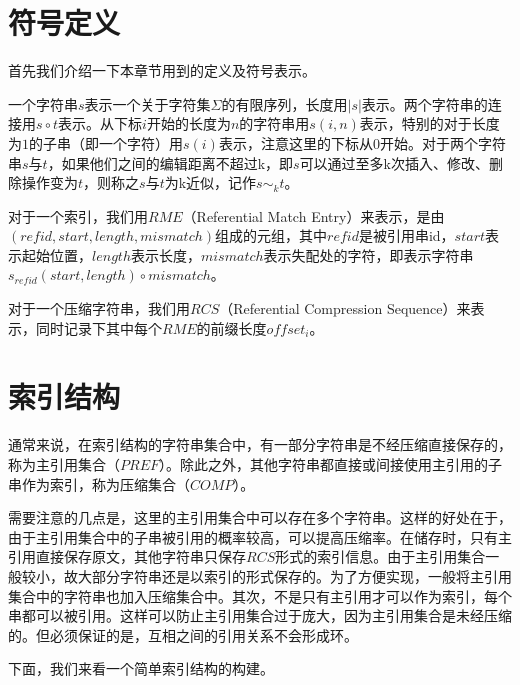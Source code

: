 ﻿\documentclass{sysuthesis}
\begin{document}
\section{符号定义}
首先我们介绍一下本章节用到的定义及符号表示。\par
一个字符串$s$表示一个关于字符集$\Sigma$的有限序列，长度用$|s|$表示。两个字符串的连接用$s \circ t$表示。从下标$i$开始的长度为$n$的字符串用$s(i, n)$表示，特别的对于长度为$1$的子串（即一个字符）用$s(i)$表示，注意这里的下标从0开始。对于两个字符串$s$与$t$，如果他们之间的编辑距离不超过k，即$s$可以通过至多k次插入、修改、删除操作变为$t$，则称之$s$与$t$为k近似，记作$s \sim_{k} t$。\par
对于一个索引，我们用$RME$（Referential Match Entry）来表示，是由$(refid, start, length, mismatch)$组成的元组，其中$refid$是被引用串id，$start$表示起始位置，$length$表示长度，$mismatch$表示失配处的字符，即表示字符串$s_{refid}(start, length) \circ mismatch$。\par
对于一个压缩字符串，我们用$RCS$（Referential Compression Sequence）来表示，同时记录下其中每个$RME$的前缀长度$offset_{i}$。



\section{索引结构}
通常来说，在索引结构的字符串集合中，有一部分字符串是不经压缩直接保存的，称为主引用集合（$PREF$）。除此之外，其他字符串都直接或间接使用主引用的子串作为索引，称为压缩集合（$COMP$）。\par
需要注意的几点是，这里的主引用集合中可以存在多个字符串。这样的好处在于，由于主引用集合中的子串被引用的概率较高，可以提高压缩率。在储存时，只有主引用直接保存原文，其他字符串只保存$RCS$形式的索引信息。由于主引用集合一般较小，故大部分字符串还是以索引的形式保存的。为了方便实现，一般将主引用集合中的字符串也加入压缩集合中。其次，不是只有主引用才可以作为索引，每个串都可以被引用。这样可以防止主引用集合过于庞大，因为主引用集合是未经压缩的。但必须保证的是，互相之间的引用关系不会形成环。\par
下面，我们来看一个简单索引结构的构建。
\end{document}
